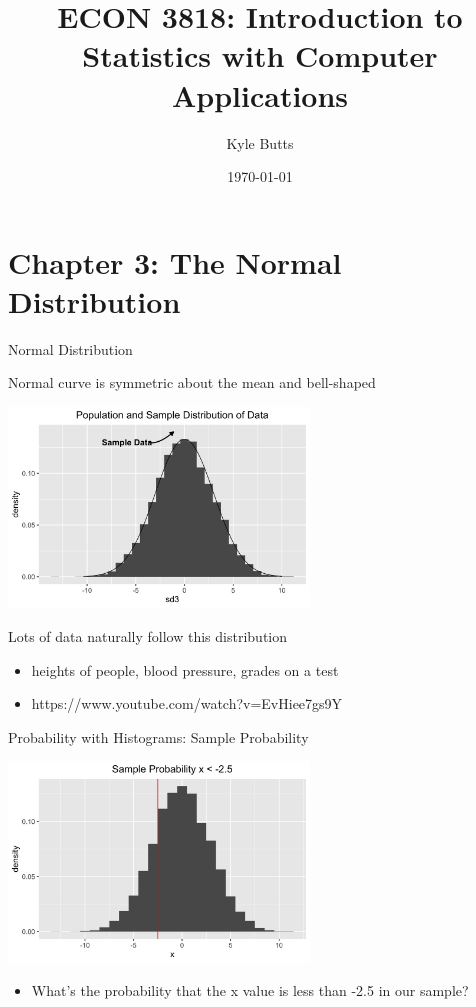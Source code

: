 \documentclass{beamer}
\title{ECON 3818: Introduction to Statistics with Computer Applications}
\date{\today}
\author{Kyle Butts}
\begin{document}
\maketitle




\section{Chapter 3: The Normal Distribution}

\begin{frame}{Normal Distribution}
    
	Normal curve is symmetric about the mean and bell-shaped
	\begin{center}
		\includegraphics[width=0.6\textwidth]{normdistnsamplehist.png}
    \end{center}
    
	Lots of data naturally follow this distribution
	\begin{itemize}
		\item heights of people, blood pressure, grades on a test
		\item https://www.youtube.com/watch?v=EvHiee7gs9Y
	\end{itemize}
\end{frame}


\begin{frame}{Probability with Histograms: Sample Probability}
    
	\begin{center}
        \includegraphics[width=0.6\textwidth]{samp_prob.png}
    \end{center}

    \begin{itemize}
        \item What's the probability that the x value is less than -2.5 in our sample?
    \end{itemize}
\end{frame}
\end{document}
